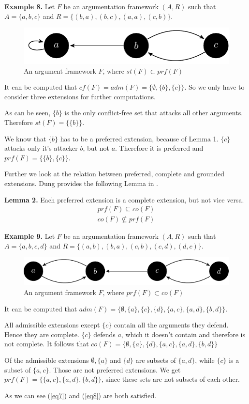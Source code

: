 \documentclass[draft,final]{vutinfth} %
\newcommand{\hl}{\par\vspace{6pt}} %
\newcommand{\cl}{\par\vspace{12pt}} %
\begin{document}
\textbf{Example 8.} Let $F$ be an argumentation framework $(A,R)$ such that $A=\{a,b,c\}$ and $R=\{(b,a),(b,c),(a,a),(c,b)\}$.\hl

\FloatBarrier
	\begin{figure}[!h]
		\centering
		\includegraphics[width=\linewidth]{graphs/ex2_v2.pdf}
		\caption{An argument framework $F$, where $st(F)\subset prf(F)$}
	\end{figure}
\FloatBarrier

It can be computed that $cf(F)=adm(F)=\{\emptyset,\{b\},\{c\}\}$. So we only have to consider three extensions for further computations.\hl
As can be seen, $\{b\}$ is the only conflict-free set that attacks all other arguments. Therefore $st(F)=\{\{b\}\}$.\hl
We know that $\{b\}$ has to be a preferred extension, because of Lemma 1. $\{c\}$ attacks only it's attacker $b$, but not $a$. Therefore it is preferred and $prf(F)=\{\{b\},\{c\}\}$.\cl

Further we look at the relation between preferred, complete and grounded extensions. Dung provides the following Lemma in \cite{Dung}.\hl

\textbf{Lemma 2.}
Each preferred extension is a complete extension, but not vice versa.
\begin{align}
	\label{eq7} prf(F)\subseteq co(F) \\ 
	\label{eq8} co(F)\not\subseteq prf(F) 
\end{align}\hl

\textbf{Example 9.} Let $F$ be an argumentation framework $(A,R)$ such that $A=\{a,b,c,d\}$ and $R=\{(a,b),(b,a),(c,b),(c,d),(d,c)\}$.\hl

\FloatBarrier
	\begin{figure}[!h]
		\centering
		\includegraphics[width=\linewidth]{graphs/ex3.pdf}
		\caption{An argument framework $F$, where $prf(F)\subset co(F)$}
	\end{figure}
\FloatBarrier

It can be computed that $adm(F)=\{\emptyset,\{a\},\{c\},\{d\},\{a,c\},\{a,d\},\{b,d\}\}$.\hl
All admissible extensions except $\{c\}$ contain all the arguments they defend. Hence they are complete. $\{c\}$ defends $a$, which it doesn't contain and therefore is not complete. It follows that $co(F)=\{\emptyset,\{a\},\{d\},\{a,c\},\{a,d\},\{b,d\}\}$\hl
Of the admissible extensions $\emptyset,\{a\}$ and $\{d\}$ are subsets of $\{a,d\}$, while $\{c\}$ is a subset of $\{a,c\}$. Those are not preferred extensions. We get $prf(F)=\{\{a,c\},\{a,d\},\{b,d\}\}$, since these sets are not subsets of each other.\hl
As we can see (\ref{eq7}) and (\ref{eq8}) are both satisfied.\cl
\end{document}
